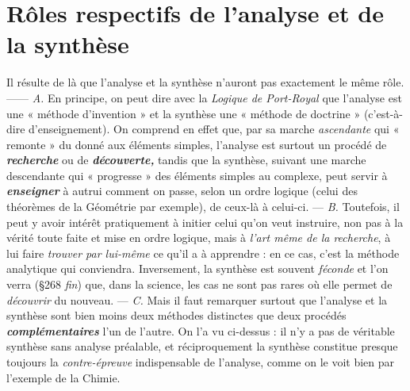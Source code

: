 \section{Rôles respectifs de l’analyse et de la synthèse}%
Il résulte de là que l’analyse et la synthèse n'auront pas exactement
le même rôle. —— {\it A.} En principe, on peut dire avec la {\it Logique de
Port-Royal} que l'analyse est une « méthode d'invention » et la synthèse
une « méthode de doctrine » (c’est-à-dire d’enseignement). On
comprend en effet que, par sa marche {\it ascendante} qui « remonte »
du donné aux éléments simples, l’analyse est surtout un procédé
de \textbf{\textit {recherche}} ou de \textbf{\textit {découverte,}} tandis que la synthèse, suivant une
marche descendante qui « progresse » des éléments simples au complexe,
peut servir à \textbf{\textit {enseigner}} à autrui comment on passe, selon un ordre
logique (celui des théorèmes de la Géométrie par exemple), de ceux-là
à celui-ci. — {\it B.} Toutefois, il peut y avoir intérêt pratiquement à initier
celui qu’on veut instruire, non pas à la vérité toute faite et mise en
ordre logique, mais à {\it l’art même de la recherche}, à lui faire {\it trouver par
lui-même} ce qu'il a à apprendre : en ce cas, c’est la méthode analytique
qui conviendra. Inversement, la synthèse est souvent {\it féconde} et l’on
verra (\S 268 {\it fin}) que, dans la science, les cas ne sont pas rares où elle
permet de {\it découvrir} du nouveau. — {\it C.} Mais il faut remarquer surtout
que l’analyse et la synthèse sont bien moins deux méthodes distinctes
que deux procédés \textbf{\textit {complémentaires}} l’un de l’autre. On l’a vu ci-dessus :
il n’y a pas de véritable synthèse sans analyse préalable, et
réciproquement la synthèse constitue presque toujours la {\it contre-épreuve}
indispensable de l’analyse, comme on le voit bien par l'exemple
de la Chimie.

